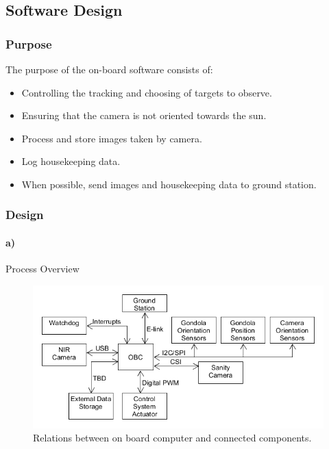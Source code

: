 \pagebreak
\subsection{Software Design}

\subsubsection{Purpose}

The purpose of the on-board software consists of:
\begin{itemize}
	\item Controlling the tracking and choosing of targets to observe.
	\item Ensuring that the camera is not oriented towards the sun.
	\item Process and store images taken by camera.
	\item Log housekeeping data.
	\item When possible, send images and housekeeping data to ground station.
\end{itemize}



\subsubsection{Design} \label{sec:4.8.2}

\paragraph{a)} Process Overview\\

\begin{figure}[H]
	\centering
	\includegraphics[width=\textwidth]{4-experiment-design/img/software/process-overview.png}
	\caption{Relations between on board computer and connected components.}
	\label{fig:software-process-overview}
\end{figure}

